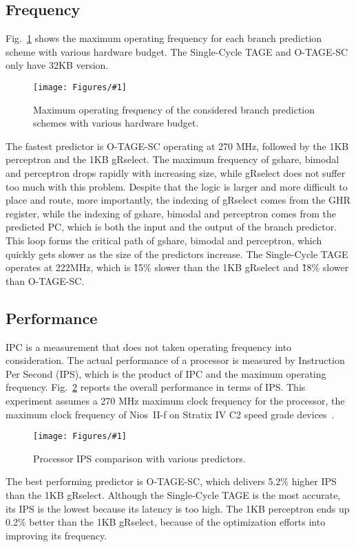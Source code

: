 \documentclass[conference]{IEEEtran}
\newcommand{\kfig}[4]{ %
        \begin{figure}[!t]
        \centering
        \texttt{[image: Figures/\#1]}
        \vspace{-1mm}
        \caption{#3}
        \label{#2}
        \end{figure}
}
\begin{document}
\subsection{Frequency}
\label{sec:eval:fmax}
Fig.~\ref{fig:adfmax} shows the maximum operating frequency for each branch prediction scheme with various hardware budget. The Single-Cycle TAGE and O-TAGE-SC only have 32KB version.
\kfig{adfmax.pdf}{fig:adfmax}{Maximum operating frequency of the considered branch prediction schemes with various hardware budget.}{angle = 0, trim = 0.7in 4.5in 0.7in 4.5in, clip, width=0.5\textwidth}

The fastest predictor is O-TAGE-SC operating at 270 MHz, followed by the 1KB perceptron and the 1KB gRselect. The maximum frequency of gshare, bimodal and perceptron drops rapidly with increasing size, while gRselect does not suffer too much with this problem. Despite that the logic is larger and more difficult to place and route, more importantly, the indexing of gRselect comes from the GHR register, while the indexing of gshare, bimodal and perceptron comes from the predicted PC, which is both the input and the output of the branch predictor. This loop forms the critical path of gshare, bimodal and perceptron, which quickly gets slower as the size of the predictors increase. The Single-Cycle TAGE operates at 222MHz, which is \~15\% slower than the 1KB gRselect and \~18\% slower than O-TAGE-SC.



\subsection{Performance}
\label{sec:eval:perf}
IPC is a measurement that does not taken operating frequency into consideration. The actual performance of a processor is measured by Instruction Per Second (IPS), which is the product of IPC and the maximum operating frequency. Fig.~\ref{fig:adips} reports the overall performance in terms of IPS. This experiment assumes a 270 MHz maximum clock frequency for the processor, the maximum clock frequency of Nios~II-f on Stratix IV C2 speed grade devices~\cite{niosfmax}.
\kfig{adips.pdf}{fig:adips}{Processor IPS comparison with various predictors.}{angle = 0, trim = 1in 1.8in 0.7in 1.8in, clip, width=0.5\textwidth}

The best performing predictor is O-TAGE-SC, which delivers 5.2\% higher IPS than the 1KB gRselect. Although the Single-Cycle TAGE is the most accurate, its IPS is the lowest because its latency is too high. The 1KB perceptron ends up 0.2\% better than the 1KB gRselect, because of the optimization efforts into improving its frequency. 
\end{document}
